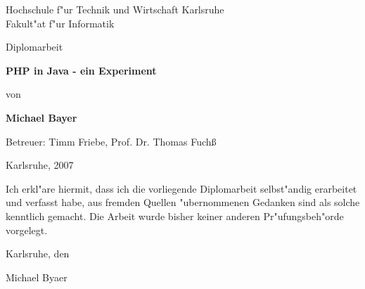 

\pagestyle{empty}
\sffamily

\noindent
\begin{center}
    \Large
    Hochschule f"ur Technik und Wirtschaft Karlsruhe\\
    Fakult"at f"ur Informatik\\
\end{center}

\vfill\vfill
\begin{center}
    \large
    Diplomarbeit\\
\end{center}

\vfill
\begin{center}
    \Huge\bfseries
    PHP in Java - ein Experiment
\end{center}

\vfill
\begin{center}
    \Large
    von 
\end{center}

\vfill
\begin{center}
    \huge\bfseries
    Michael Bayer
\end{center}

\vfill\vfill\vfill
\begin{center}
    \Large
    Betreuer: Timm Friebe,  Prof. Dr. Thomas Fuch\ss
\end{center}

\vfill
\begin{center}
\large
    Karlsruhe, 2007
\end{center}

\cleardoublepage

\pagestyle{empty}
Ich erkl"are hiermit, dass ich die vorliegende Diplomarbeit 
selbst"andig erarbeitet und verfasst habe, aus fremden Quellen 
"ubernommenen Gedanken sind als solche kenntlich gemacht. Die Arbeit 
wurde bisher keiner anderen Pr"ufungsbeh"orde vorgelegt. 

\vspace{1cm}
Karlsruhe, den 

\vspace{2cm}
\hfill Michael Byaer

